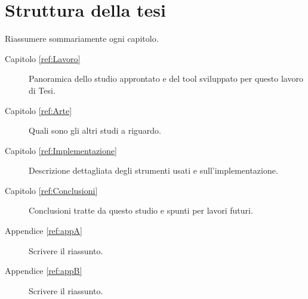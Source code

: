 
\section{Struttura della tesi}

Riassumere sommariamente ogni capitolo.

\begin{description}
	\item[Capitolo \ref{ref:Lavoro}] Panoramica dello studio approntato e del tool sviluppato per questo lavoro di Tesi.

	\item[Capitolo \ref{ref:Arte}] Quali sono gli altri studi a riguardo.

	\item[Capitolo \ref{ref:Implementazione}] Descrizione dettagliata degli strumenti usati e sull'implementazione.

	\item[Capitolo \ref{ref:Conclusioni}] Conclusioni tratte da questo studio e spunti per lavori futuri.

	\item[Appendice \ref{ref:appA}] Scrivere il riassunto.

	\item[Appendice \ref{ref:appB}] Scrivere il riassunto.
\end{description}